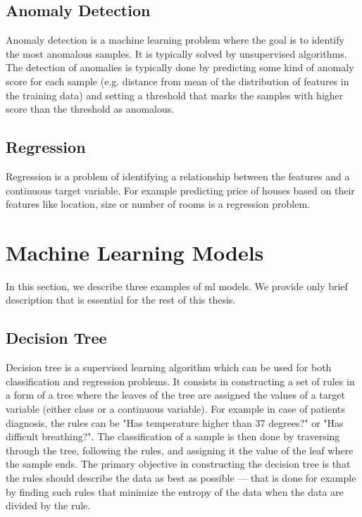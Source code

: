 \subsection{Anomaly Detection}

Anomaly detection is a machine learning problem where the goal is to identify the most anomalous samples.
It is typically solved by unsupervised  algorithms.
The detection of anomalies is typically done by predicting some kind of anomaly score for each sample (e.g. distance from mean of the distribution of features in the training data) and setting a threshold that marks the samples with higher score than the threshold as anomalous.

\subsection{Regression}

Regression is a problem of identifying a relationship between the features and a continuous target variable.
For example predicting price of houses based on their features like location, size or number of rooms is a regression problem.

\section{Machine Learning Models}
\label{sec:ml_models}

In this section, we describe three examples of \acrshort{ml} models.
We provide only brief description that is essential for the rest of this thesis.

\subsection{Decision Tree}

Decision tree is a supervised learning algorithm which can be used for both classification and regression problems.
It consists in constructing a set of rules in a form of a tree where the leaves of the tree are assigned the values of a target variable (either class or a continuous variable).
For example in case of patients diagnosis, the rules can be "Has temperature higher than 37 degrees?" or "Has difficult breathing?".
The classification of a sample is then done by traversing through the tree, following the rules, and assigning it the value of the leaf where the sample ends.
The primary objective in constructing the decision tree is that the rules should describe the data as best as possible --- that is done for example by finding such rules that minimize the entropy of the data when the data are divided by the rule.


